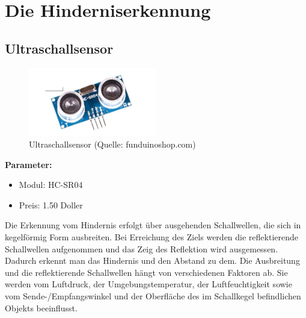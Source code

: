 \renewcommand{\autoren}{Valentyn Chepil}
\newpage
\section{Die Hinderniserkennung}
\subsection{Ultraschallsensor}

\begin{figure}[!h]  %
	\centering\includegraphics[width=0.5\textwidth]{images/Bild-1-1.png}
	\caption{Ultraschallsensor \newline(Quelle: funduinoshop.com)}
	\label{bild_1.1} %
\end{figure}

\textbf{Parameter:}  %
\begin{itemize} 
	\item Modul: HC-SR04 
	\item Preis:  1.50 Doller
\end{itemize}

Die Erkennung vom Hindernis erfolgt über ausgehenden Schallwellen, die sich in kegelförmig Form  ausbreiten. Bei Erreichung des Ziels werden die reflektierende Schallwellen aufgenommen und das Zeig des Reflektion wird ausgemessen. Dadurch erkennt man das Hindernis und den Abstand zu dem. Die Ausbreitung und die reflektierende Schallwellen hängt von verschiedenen Faktoren ab. Sie werden vom Luftdruck, der Umgebungstemperatur, der Luftfeuchtigkeit sowie vom Sende-/Empfangswinkel und der Oberfläche des im Schallkegel befindlichen Objekts
beeinflusst.

